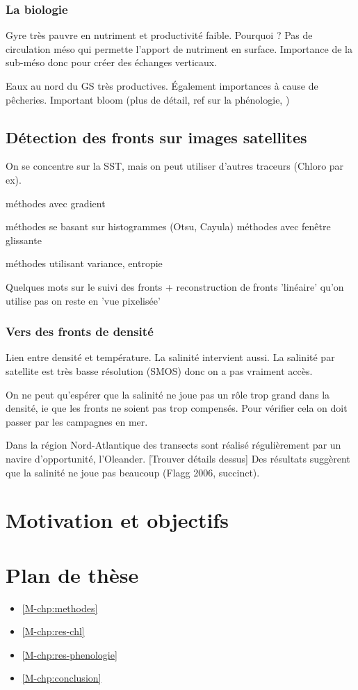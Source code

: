 \documentclass[master]{subfiles}
\begin{document}
\subsubsection{La biologie}
\label{sec:gs-biologie}

Gyre très pauvre en nutriment et productivité faible.
Pourquoi ?
Pas de circulation méso qui permette l'apport de nutriment en surface.
Importance de la sub-méso donc pour créer des échanges verticaux.

Eaux au nord du GS très productives.
Également importances à cause de pêcheries.
Important bloom (plus de détail, ref sur la phénologie, )


\subsection{Détection des fronts sur images satellites}
\label{sec:detection-fronts}

On se concentre sur la SST, mais on peut utiliser d'autres traceurs (Chloro par ex).

méthodes avec gradient

méthodes se basant sur histogrammes (Otsu, Cayula)
méthodes avec fenêtre glissante

méthodes utilisant variance, entropie

Quelques mots sur le suivi des fronts + reconstruction de fronts 'linéaire'
qu'on utilise pas on reste en 'vue pixelisée'

\subsubsection{Vers des fronts de densité}


Lien entre densité et température.
La salinité intervient aussi. La salinité par satellite est très basse résolution (SMOS) donc on a pas vraiment accès.

On ne peut qu'espérer que la salinité ne joue pas un rôle trop grand dans la densité, ie que les fronts ne soient pas trop compensés.
Pour vérifier cela on doit passer par les campagnes en mer.

Dans la région Nord-Atlantique des transects sont réalisé régulièrement par un navire d'opportunité, l'Oleander.
[Trouver détails dessus]
Des résultats suggèrent que la salinité ne joue pas beaucoup (Flagg 2006, succinct).

\section{Motivation et objectifs}
\label{sec:problematique}

\section{Plan de thèse}
\label{sec:plan-de-these}

\begin{itemize}
  \item \cref{M-chp:methodes}
  \item \cref{M-chp:res-chl}
  \item \cref{M-chp:res-phenologie}
  \item \cref{M-chp:conclusion}
\end{itemize}
\end{document}

